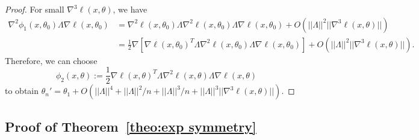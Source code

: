 \documentclass{article}
\theoremstyle{plain}
\begin{document}
\begin{proof}
For small $\nabla^3\ell(x,\theta)$, we have
\begin{equation}
\begin{aligned}
\nabla^2\phi_1(x,\theta_0)\Lambda\nabla\ell(x,\theta_0)&=\nabla^2\ell(x,\theta_0)\Lambda\nabla^2\ell(x,\theta_0)\Lambda\nabla\ell(x,\theta_0)+O(||\Lambda||^2||\nabla^3\ell(x,\theta)||)\\&=\frac{1}{2}\nabla[\nabla\ell(x,\theta_0)^T\Lambda\nabla^2\ell(x,\theta_0)\Lambda\nabla\ell(x,\theta_0)]+O(||\Lambda||^2||\nabla^3\ell(x,\theta)||).
\end{aligned}
\end{equation}
Therefore, we can choose
\begin{equation}
\phi_2(x,\theta):=\frac{1}{2}\nabla\ell(x,\theta)^T\Lambda\nabla^2\ell(x,\theta)\Lambda\nabla\ell(x,\theta)
\end{equation}
to obtain $\theta_n'=\theta_1+O(||\Lambda||^4+||\Lambda||^2/n+||\Lambda||^3/n+||\Lambda||^3||\nabla^3\ell(x,\theta)||)$.
\end{proof}

\subsection{Proof of Theorem~\ref{theo:exp symmetry}}
\end{document}
